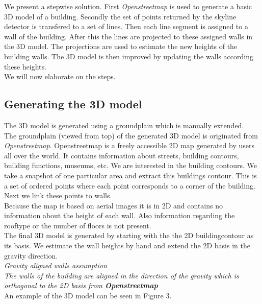 \documentclass[10pt]{article}
\begin{document}
We present a stepwise solution. First \emph{Openstreetmap} is used to generate
a basic 3D model of a building. Secondly the set of points returned by the
skyline detector is transfered to a set of lines. Then each line segment is
assigned to a wall of the building. After this the lines are projected to these
assigned walls in the 3D model. 
The projections are used to estimate the new heights of the building walls.
The 3D model is then improved by updating the walls according these heights. \\
We will now elaborate on the steps.

\subsection{Generating the 3D model}
The 3D model is generated using a groundplain which is manually extended.\\
The groundplain (viewed from top) of the generated 3D model is originated from
\emph{Openstreetmap}.  Openstreetmap is a freely accessible 2D map generated by
users all over the world. It contains information about streets, building
contours, building functions, museums, etc.  We are interested in the building
contours.  We take a snapshot of one particular area and extract this buildings
contour.  This is a set of ordered points where each point corresponds to a
corner of the building.  Next we link these points to walls.\\ 
Because the map is based on aerial images it is in 2D and contains no
information about the height of each wall.  Also information regarding the
rooftype or the number of floors is not present.\\
The final 3D model is generated by starting with the the 2D buildingcontour as
its basis. We estimate the wall heights by hand and extend the
2D basis in the gravity direction.\\
\emph{Gravity aligned walls assumption}\\
	\emph{The walls of the building are aligned in the direction of the gravity
	which is orthogonal to the 2D basis from \textbf{Openstreetmap}}\\

An example of the 3D model can be seen in Figure 3.\\
\end{document}
